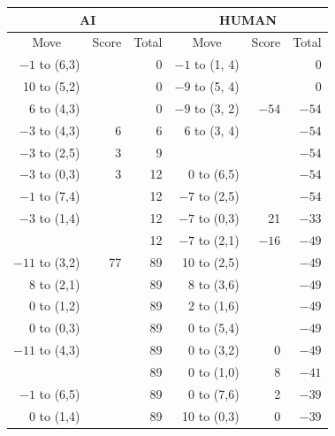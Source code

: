 \begin{appendices}
\begin{table}[H]
    \centering
    \begin{tabular}{rrrrrr}
        \hline
        \multicolumn{3}{c}{AI}        & \multicolumn{3}{c}{HUMAN}     \\ \hline
        \multicolumn{1}{c}{Move}         & \multicolumn{1}{c}{Score} & \multicolumn{1}{c}{Total} & \multicolumn{1}{c}{Move}         & \multicolumn{1}{c}{Score} & \multicolumn{1}{c}{Total} \\ \hline
          $-1$ to (6,3) &      &  0    & $-1$ to (1, 4) &      &  0    \\ \hline
          10 to (5,2) &      &  0    &   $-9$ to (5, 4) &      &  0    \\ \hline
          6 to (4,3) &      &  0    &   $-9$ to (3, 2) &  $-54$    &  $-54$    \\ \hline
         $-3$ to (4,3) &  6    &  6    &   6 to (3, 4) &      &  $-54$    \\ \hline
         $-3$ to (2,5) &  3    &  9    &               &      &  $-54$    \\ \hline
         $-3$ to (0,3) &  3    &  12    &   0 to (6,5)        &      &  $-54$    \\ \hline
         $-1$ to (7,4) &      &  12    &  $-7$ to (2,5)        &      &  $-54$    \\ \hline
         $-3$ to (1,4) &      &  12    &  $-7$ to (0,3)        &  21 &  $-33$    \\ \hline
                      &      &  12    &   $-7$ to (2,1)        &  $-16$    &  $-49$    \\ \hline
          $-11$ to (3,2) &  77    &  89    &   10 to (2,5)        &      &  $-49$    \\ \hline
          8 to (2,1) &      &  89    &   8 to (3,6)        &      &  $-49$    \\ \hline
          0 to (1,2) &      &  89    &   2 to (1,6)        &      &  $-49$    \\ \hline
          0 to (0,3) &      &  89    &   0 to (5,4)        &      &  $-49$    \\ \hline
          $-11$ to (4,3) &      &  89    &   0 to (3,2)        &  $0$    &  $-49$    \\ \hline
                       &      &  89    &   0 to (1,0)        &  8    &  $-41$    \\ \hline
          $-1$ to (6,5) &      &  89    &   0 to (7,6)        &  2    &  $-39$    \\ \hline
          0 to (1,4) &      &  89    &   10 to (0,3)        &  0    &  $-39$    \\ \hline

\end{tabular}
\end{table}
\end{appendices}
